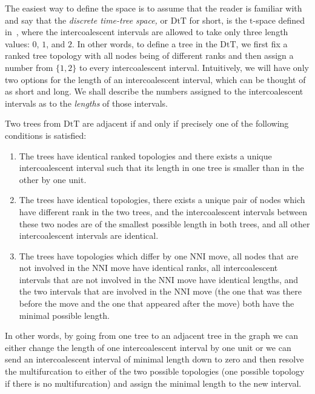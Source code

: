 \documentclass{amsart}
\newcommand{\dts}{\mathrm{DtT}}
\begin{document}
The easiest way to define the space is to assume that the reader is familiar
with~\cite{Gavryushkin2014-bw} and say that the
{\em discrete time-tree space,}
or $\dts$ for short, is the $\mathrm t$-space defined
in~\cite{Gavryushkin2014-bw}, where the intercoalescent intervals are allowed to take only three length values: $0$, $1$, and $2$.
In other words, to define a tree in the $\dts$, we first fix a ranked tree
topology with all nodes being of different ranks and then assign a number
from $\{1,2\}$ to every intercoalescent interval.
Intuitively, we will have
only two options for the length of an intercoalescent interval, which can
be thought of as short
and long.
We shall describe the numbers assigned to the intercoalescent intervals as to the {\em lengths} of those intervals.

Two trees from $\dts$ are adjacent if and only if precisely one of the following
conditions is satisfied:

\begin{enumerate}[(1)]
\item The trees have identical ranked topologies and there exists a unique
intercoalescent interval such that its length in one tree is smaller than in the
other by one unit.
\item The trees have identical topologies, there exists a unique pair of nodes
which have different rank in the two trees, and the intercoalescent intervals
between these two nodes are of the smallest possible length in both trees, and all other intercoalescent intervals are identical.
\item The trees have topologies which differ by one NNI move, all nodes that
are not involved in the NNI move have identical ranks, all intercoalescent
intervals that are not involved in the NNI move have identical lengths,
and the two intervals that are involved in the NNI move (the one that was there
before the move and the one that appeared after the move) both have the minimal
possible length.
\end{enumerate}

In other words, by going from one tree to an adjacent tree in the graph we can
either change the length of one intercoalescent interval by one unit or we
can send an intercoalescent interval of minimal length down to zero and
then resolve the multifurcation to either of the two possible topologies
(one possible topology if there is no multifurcation) and
assign the minimal length to the new interval.
\end{document}
